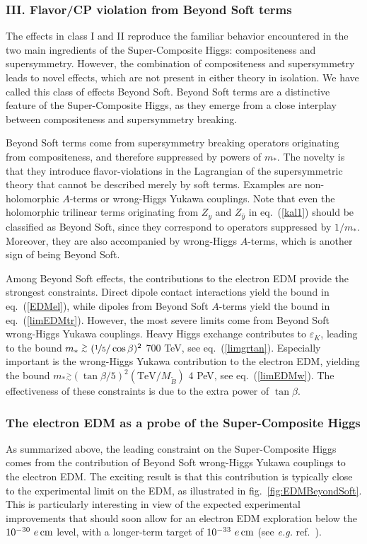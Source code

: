 \documentclass[a4paper,12pt]{article}
\newcommand{\gsim}{\stackrel{>}{_\sim}}
\def\eq#1{eq.~(\ref{#1})}
\def\fig#1{fig.~\ref{#1}}
\def\eq#1{eq.~(\ref{#1})}
\def\fig#1{fig.~\ref{#1}}
\def\mst{m_*}
\begin{document}
{{{{\subsubsection*{III. Flavor/CP violation from Beyond Soft terms}

The effects in class I and II reproduce the familiar behavior encountered in the two main ingredients of the Super-Composite Higgs: compositeness and supersymmetry. However, the combination of compositeness and supersymmetry leads to novel effects, which are not present in either theory in isolation. We have called this class of effects Beyond Soft. Beyond Soft terms are a distinctive feature of the Super-Composite Higgs, as they emerge from a close interplay between compositeness and supersymmetry breaking.

Beyond Soft terms come from supersymmetry breaking operators originating from compositeness, and therefore suppressed by powers of $\mst$. The novelty is that they introduce flavor-violations in the Lagrangian of the supersymmetric theory that cannot be described merely by soft terms. Examples are non-holomorphic $A$-terms or wrong-Higgs Yukawa couplings. Note that even the holomorphic trilinear terms originating from $Z_{y}$ and $Z_{\hat y}$ in \eq{kal1} should be classified as Beyond Soft, since they correspond to operators suppressed by $1/\mst$. Moreover, they are also accompanied by wrong-Higgs $A$-terms, which is another sign of being Beyond Soft.

Among Beyond Soft effects, the contributions to the electron EDM provide the strongest constraints. Direct dipole contact interactions yield the bound in \eq{EDMel}, while dipoles from Beyond Soft $A$-terms yield the bound in \eq{limEDMtr}. However, the most severe limits come from Beyond Soft wrong-Higgs Yukawa couplings. Heavy Higgs exchange contributes to $\varepsilon_K$, leading to the bound $\mst \gsim (\nicefrac{1}{5}/\cos\beta)^2$ 700 TeV, see \eq{limgrtan}. Especially important is the wrong-Higgs Yukawa contribution to the electron EDM, yielding the bound $\mst \gsim (\tan\beta/5)^2(\textrm{TeV}/M_{\tilde B})$ 4 PeV, see \eq{limEDMw}. The effectiveness of these constraints is due to the extra power of $\tan\beta$.

\subsubsection*{The electron EDM as a probe of the Super-Composite Higgs}
As summarized above, the leading constraint on the Super-Composite Higgs comes from the contribution of Beyond Soft wrong-Higgs Yukawa couplings to the electron EDM. The exciting result is that this contribution is typically close to the experimental limit on the EDM, as illustrated in \fig{fig:EDMBeyondSoft}. This is particularly interesting in view of the expected experimental improvements that should soon allow for an electron EDM exploration below the $10^{-30}~e\,{\rm cm}$ level, with a longer-term target of $10^{-33}~e\,{\rm cm}$ (see {\it e.g.} ref.~\cite{DeMille:2024djy}). 

}}}}
\end{document}
